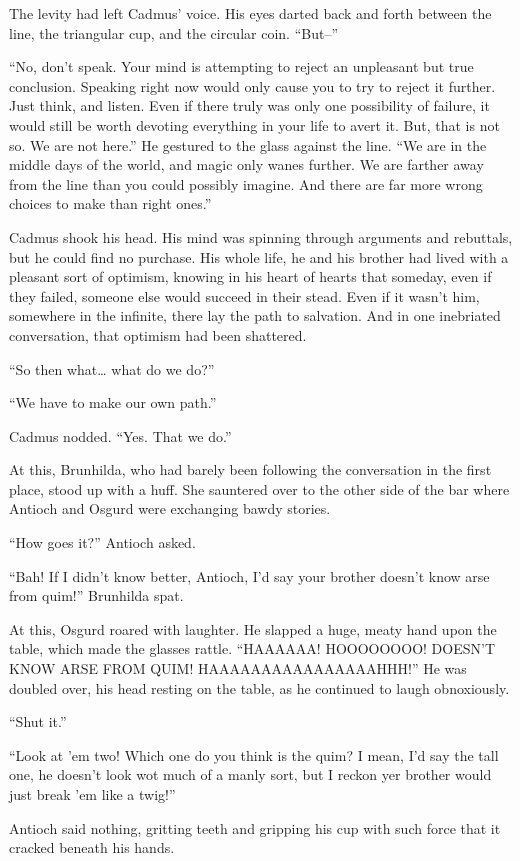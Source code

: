 The levity had left Cadmus’ voice. His eyes darted back and forth between the line, the triangular cup, and the circular coin. “But–”

“No, don’t speak. Your mind is attempting to reject an unpleasant but true conclusion. Speaking right now would only cause you to try to reject it further. Just think, and listen. Even if there truly was only one possibility of failure, it would still be worth devoting everything in your life to avert it. But, that is not so. We are not here.” He gestured to the glass against the line. “We are in the middle days of the world, and magic only wanes further. We are farther away from the line than you could possibly imagine. And there are far more wrong choices to make than right ones.”

Cadmus shook his head. His mind was spinning through arguments and rebuttals, but he could find no purchase. His whole life, he and his brother had lived with a pleasant sort of optimism, knowing in his heart of hearts that someday, even if they failed, someone else would succeed in their stead. Even if it wasn’t him, somewhere in the infinite, there lay the path to salvation. And in one inebriated conversation, that optimism had been shattered.

“So then what… what do we do?”

“We have to make our own path.”

Cadmus nodded. “Yes. That we do.”

At this, Brunhilda, who had barely been following the conversation in the first place, stood up with a huff. She sauntered over to the other side of the bar where Antioch and Osgurd were exchanging bawdy stories.

“How goes it?” Antioch asked.

“Bah! If I didn’t know better, Antioch, I’d say your brother doesn’t know arse from quim!” Brunhilda spat.

At this, Osgurd roared with laughter. He slapped a huge, meaty hand upon the table, which made the glasses rattle. “HAAAAAA! HOOOOOOOO! DOESN’T KNOW ARSE FROM QUIM! HAAAAAAAAAAAAAAAAHHH!” He was doubled over, his head resting on the table, as he continued to laugh obnoxiously.

“Shut it.”

“Look at ’em two! Which one do you think is the quim? I mean, I’d say the tall one, he doesn’t look wot much of a manly sort, but I reckon yer brother would just break ’em like a twig!”

Antioch said nothing, gritting teeth and gripping his cup with such force that it cracked beneath his hands.

